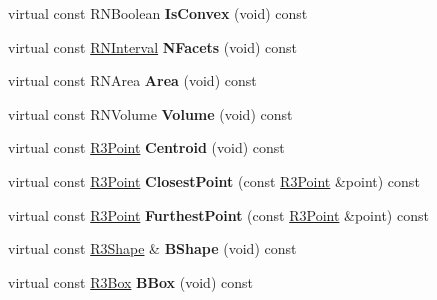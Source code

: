 \begin{DoxyCompactItemize}
\item 
virtual const R\+N\+Boolean {\bfseries Is\+Convex} (void) const \hypertarget{class_r3_sphere_a9facb28d0c47ef3b822371c27511eb78}{}\label{class_r3_sphere_a9facb28d0c47ef3b822371c27511eb78}

\item 
virtual const \hyperlink{class_r_n_interval}{R\+N\+Interval} {\bfseries N\+Facets} (void) const \hypertarget{class_r3_sphere_a48201ee9b34adb2e9338162eec55d61e}{}\label{class_r3_sphere_a48201ee9b34adb2e9338162eec55d61e}

\item 
virtual const R\+N\+Area {\bfseries Area} (void) const \hypertarget{class_r3_sphere_a00fea0038d75f61da89f6d4c2c61468d}{}\label{class_r3_sphere_a00fea0038d75f61da89f6d4c2c61468d}

\item 
virtual const R\+N\+Volume {\bfseries Volume} (void) const \hypertarget{class_r3_sphere_a1e5f94290ff0c0cffb50a2e4a480df14}{}\label{class_r3_sphere_a1e5f94290ff0c0cffb50a2e4a480df14}

\item 
virtual const \hyperlink{class_r3_point}{R3\+Point} {\bfseries Centroid} (void) const \hypertarget{class_r3_sphere_a3ea4f238c55334f8d05d08db6fc6c7ec}{}\label{class_r3_sphere_a3ea4f238c55334f8d05d08db6fc6c7ec}

\item 
virtual const \hyperlink{class_r3_point}{R3\+Point} {\bfseries Closest\+Point} (const \hyperlink{class_r3_point}{R3\+Point} \&point) const \hypertarget{class_r3_sphere_ae76c7d580e8cc17dadee06753adf37ff}{}\label{class_r3_sphere_ae76c7d580e8cc17dadee06753adf37ff}

\item 
virtual const \hyperlink{class_r3_point}{R3\+Point} {\bfseries Furthest\+Point} (const \hyperlink{class_r3_point}{R3\+Point} \&point) const \hypertarget{class_r3_sphere_a801de3885443b757fda2af2d1c83e7d5}{}\label{class_r3_sphere_a801de3885443b757fda2af2d1c83e7d5}

\item 
virtual const \hyperlink{class_r3_shape}{R3\+Shape} \& {\bfseries B\+Shape} (void) const \hypertarget{class_r3_sphere_a2fc29cd666cd8ad6d3ea8453f7fe20eb}{}\label{class_r3_sphere_a2fc29cd666cd8ad6d3ea8453f7fe20eb}

\item 
virtual const \hyperlink{class_r3_box}{R3\+Box} {\bfseries B\+Box} (void) const \hypertarget{class_r3_sphere_a880d6ddda6599979cfdace0793c5adee}{}\label{class_r3_sphere_a880d6ddda6599979cfdace0793c5adee}


\end{DoxyCompactItemize}

